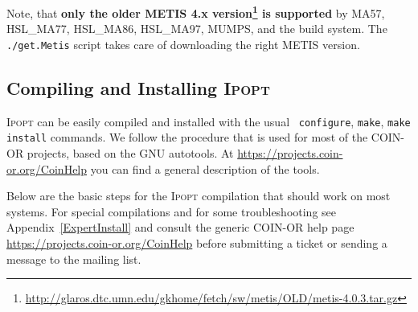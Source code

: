 \documentclass[10pt]{article}
\newcommand{\Ipopt}{\textsc{Ipopt}\xspace}
\begin{document}
Note, that {\bf only the older METIS 4.x version\footnote{\url{http://glaros.dtc.umn.edu/gkhome/fetch/sw/metis/OLD/metis-4.0.3.tar.gz}} is supported} by
MA57, HSL\_MA77, HSL\_MA86, HSL\_MA97, MUMPS, and the build system.
The \texttt{./get.Metis} script takes care of downloading the right METIS version.

\subsection{Compiling and Installing \Ipopt} \label{sec.comp_and_inst}

\Ipopt can be easily compiled and installed with the usual {\tt
  configure}, {\tt make}, {\tt make install} commands.  We follow the
procedure that is used for most of the COIN-OR projects, based on the
GNU autotools.  At \url{https://projects.coin-or.org/CoinHelp}
you can find a general description of the tools.

Below are the basic steps for the \Ipopt compilation that should work
on most systems.  For special compilations and for some
troubleshooting see Appendix~\ref{ExpertInstall} and consult the
generic COIN-OR help page
\url{https://projects.coin-or.org/CoinHelp} before submitting a
ticket or sending a message to the mailing list.
\end{document}
